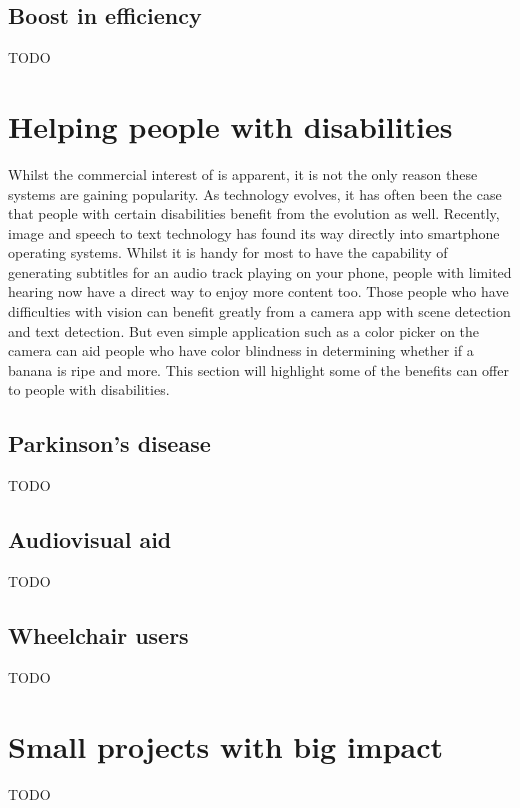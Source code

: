\subsection{Boost in efficiency}
\label{subsec:introduction_gaining_popularity_efficiency}
TODO

\section{Helping people with disabilities}
\label{sec:introduction_helping_disabled}

Whilst the commercial interest of  is apparent, it is not the only reason these systems are gaining popularity.
As technology evolves, it has often been the case that people with certain disabilities benefit from the evolution as well.
Recently, image and speech to text technology has found its way directly into smartphone operating systems.
Whilst it is handy for most to have the capability of generating subtitles for an audio track playing on your phone, people with limited hearing now have a direct way to enjoy more content too.
Those people who have difficulties with vision can benefit greatly from a camera app with scene detection and text detection.
But even simple application such as a color picker on the camera can aid people who have color blindness in determining whether if a banana is ripe and more.
This section will highlight some of the benefits  can offer to people with disabilities.

\subsection{Parkinson's disease}
\label{subsec:introduction_helping_disabled_parkinson}
TODO

\subsection{Audiovisual aid}
\label{subsec:introduction_helping_disabled_audiovisual}
TODO

\subsection{Wheelchair users}
\label{subsec:introduction_helping_disabled_wheelchair}
TODO

\section{Small projects with big impact}
\label{sec:introduction_small_projects}
TODO

